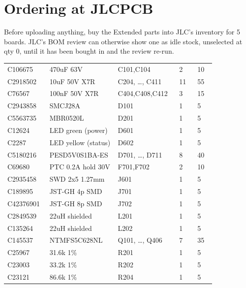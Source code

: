 \section{Ordering at JLCPCB}

Before uploading anything, buy the Extended parts into JLC's inventory for 5
boards. JLC's BOM review can otherwise show one as idle stock, unselected at
qty 0, until it has been bought in and the review re-run.

\begin{hsblock}
\par\vspace{8pt}
{\scriptsize
\renewcommand{\arraystretch}{1.12}
\begin{tabular}{L{0.14\linewidth} L{0.30\linewidth} L{0.24\linewidth} L{0.08\linewidth} L{0.08\linewidth}}
\hstoprule
{} &  &  &  &  \\
\hline
C106675 & 470uF 63V & C101,C104 & 2 & 10 \\
C2918502 & 10uF 50V X7R & C204, \ldots, C411 & 11 & 55 \\
C76567 & 100nF 50V X7R & C404,C408,C412 & 3 & 15 \\
C2943858 & SMCJ28A & D101 & 1 & 5 \\
C5563735 & MBR0520L & D201 & 1 & 5 \\
C12624 & LED green (power) & D601 & 1 & 5 \\
C2287 & LED yellow (status) & D602 & 1 & 5 \\
C5180216 & PESD5V0S1BA-ES & D701, \ldots, D711 & 8 & 40 \\
C69680 & PTC 0.2A hold 30V & F701,F702 & 2 & 10 \\
C2935458 & SWD 2x5 1.27mm & J601 & 1 & 5 \\
C189895 & JST-GH 4p SMD & J701 & 1 & 5 \\
C42376901 & JST-GH 8p SMD & J702 & 1 & 5 \\
C2849539 & 22uH shielded & L201 & 1 & 5 \\
C135264 & 22uH shielded & L202 & 1 & 5 \\
C145537 & NTMFS5C628NL & Q101, \ldots, Q406 & 7 & 35 \\
C25967 & 31.6k 1\% & R201 & 1 & 5 \\
C23003 & 33.2k 1\% & R202 & 1 & 5 \\
C23121 & 86.6k 1\% & R204 & 1 & 5 \\

\end{tabular}}
\end{hsblock}
